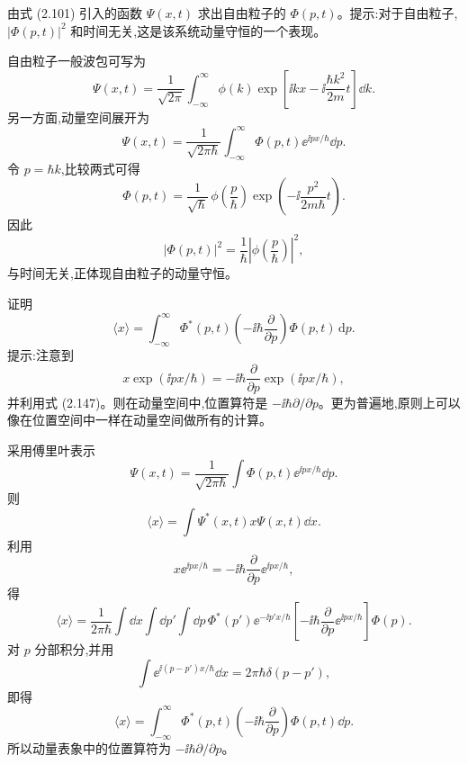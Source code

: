\begin{question}
由式 (2.101) 引入的函数 $\Psi(x,t)$ 求出自由粒子的 $\Phi(p,t)$。提示:对于自由粒子,$|\Phi(p,t)|^2$ 和时间无关,这是该系统动量守恒的一个表现。

\par\smallskip
{}

\end{question}
\begin{solution}
自由粒子一般波包可写为
\[
\Psi(x,t)=\frac1{\sqrt{2\pi}}\int_{-\infty}^{\infty}
\phi(k)\exp\left[\ii kx-\ii\frac{\hbar k^2}{2m}t\right]\dd k.
\]
另一方面,动量空间展开为
\[
\Psi(x,t)=\frac1{\sqrt{2\pi\hbar}}\int_{-\infty}^{\infty}
\Phi(p,t)\ee^{\ii px/\hbar}\dd p.
\]
令 $p=\hbar k$,比较两式可得
\[
\boxed{\Phi(p,t)=\frac1{\sqrt\hbar}\,\phi\left(\frac p\hbar\right)
\exp\left(-\ii\frac{p^2}{2m\hbar}t\right).}
\]
因此
\[
|\Phi(p,t)|^2=\frac1\hbar\left|\phi\left(\frac p\hbar\right)\right|^2,
\]
与时间无关,正体现自由粒子的动量守恒。
\end{solution}

\begin{question}
证明
\[
\langle x\rangle=\int_{-\infty}^{\infty}\Phi^*(p,t)\left(-\ii\hbar\frac{\partial}{\partial p}\right)\Phi(p,t)\,\mathrm dp .
\tag{3.57}
\]
提示:注意到
\[
x\exp(\ii px/\hbar)=-\ii\hbar\frac{\partial}{\partial p}\exp(\ii px/\hbar),
\]
并利用式 (2.147)。则在动量空间中,位置算符是 $-\ii\hbar\partial/\partial p$。更为普遍地,原则上可以像在位置空间中一样在动量空间做所有的计算。

\par\smallskip
{}

\end{question}
\begin{solution}
采用傅里叶表示
\[
\Psi(x,t)=\frac1{\sqrt{2\pi\hbar}}\int \Phi(p,t)\ee^{\ii px/\hbar}\dd p.
\]
则
\[
\langle x\rangle=\int \Psi^*(x,t)x\Psi(x,t)\dd x.
\]
利用
\[
x \ee^{\ii px/\hbar}=-\ii\hbar\frac{\partial}{\partial p}\ee^{\ii px/\hbar},
\]
得
\[
\langle x\rangle
=\frac1{2\pi\hbar}\int\dd x\int\dd p'\int\dd p\,
\Phi^*(p')\ee^{-\ii p'x/\hbar}\left[-\ii\hbar\frac{\partial}{\partial p}\ee^{\ii px/\hbar}\right]\Phi(p).
\]
对 $p$ 分部积分,并用
\[
\int \ee^{\ii(p-p')x/\hbar}\dd x=2\pi\hbar\delta(p-p'),
\]
即得
\[
\boxed{\langle x\rangle=\int_{-\infty}^{\infty}\Phi^*(p,t)
\left(-\ii\hbar\frac{\partial}{\partial p}\right)\Phi(p,t)\dd p.}
\]
所以动量表象中的位置算符为 $-\ii\hbar\partial/\partial p$。
\end{solution}

